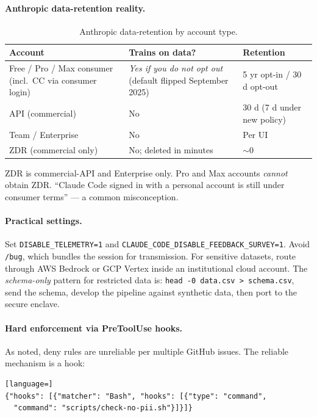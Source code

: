 \documentclass[11pt]{article}
\begin{document}
\paragraph{Anthropic data-retention reality.}

\begin{table}[h]
\centering
\small
\begin{tabularx}{\linewidth}{@{}lXl@{}}
\toprule
\textbf{Account} & \textbf{Trains on data?} & \textbf{Retention} \\
\midrule
Free / Pro / Max consumer (incl.\ CC via consumer login) & \emph{Yes if you do not opt out} (default flipped September 2025) & 5 yr opt-in / 30 d opt-out \\
API (commercial) & No & 30 d (7 d under new policy) \\
Team / Enterprise & No & Per UI \\
ZDR (commercial only) & No; deleted in minutes & $\sim$0 \\
\bottomrule
\end{tabularx}
\caption{Anthropic data-retention by account type.}
\end{table}

ZDR is commercial-API and Enterprise only. Pro and Max accounts \emph{cannot} obtain ZDR. ``Claude Code signed in with a personal account is still under consumer terms'' --- a common misconception.

\paragraph{Practical settings.} Set \texttt{DISABLE\_TELEMETRY=1} and \texttt{CLAUDE\_CODE\_DISABLE\_FEEDBACK\_SURVEY=1}. Avoid \texttt{/bug}, which bundles the session for transmission. For sensitive datasets, route through AWS Bedrock or GCP Vertex inside an institutional cloud account. The \emph{schema-only} pattern for restricted data is: \texttt{head -0 data.csv > schema.csv}, send the schema, develop the pipeline against synthetic data, then port to the secure enclave.

\paragraph{Hard enforcement via PreToolUse hooks.} As noted, deny rules are unreliable per multiple GitHub issues. The reliable mechanism is a hook:

\begin{lstlisting}[language=]
{"hooks": [{"matcher": "Bash", "hooks": [{"type": "command",
  "command": "scripts/check-no-pii.sh"}]}]}
\end{lstlisting}
\end{document}
